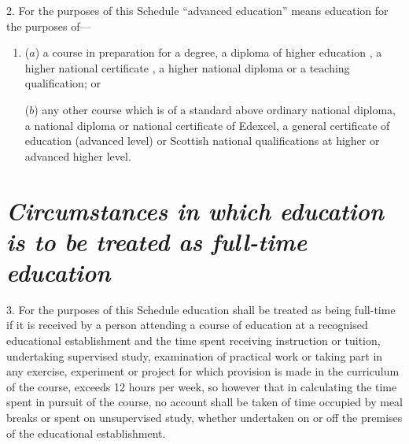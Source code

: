 \documentclass[12pt,a4paper]{article}
\begin{document}
2.  For the purposes of 
this Schedule  %
“advanced education” means education for the purposes of—
\begin{enumerate}\item[]
($a$) a course in preparation for a degree, a diploma of higher education%
, a higher national certificate%
, a higher national diploma or a teaching qualification; or

($b$) any other course which is of a standard above ordinary national diploma, a national diploma or national certificate of Edexcel, a general certificate of education (advanced level) or Scottish national qualifications at higher or advanced higher level.
\end{enumerate}


\section*{\itshape Circumstances in which education is to be treated as full-time education}

3.  For the purposes of 
this Schedule  %
education shall be treated as being full-time if it is received by a person attending a course of education at a recognised educational establishment and the time spent receiving instruction or tuition, undertaking supervised study, examination of practical work or taking part in any exercise, experiment or project for which provision is made in the curriculum of the course, exceeds 12 hours per week, so however that in calculating the time spent in pursuit of the course, no account shall be taken of time occupied by meal breaks or spent on unsupervised study, whether undertaken on or off the premises of the educational establishment.

\end{document}
